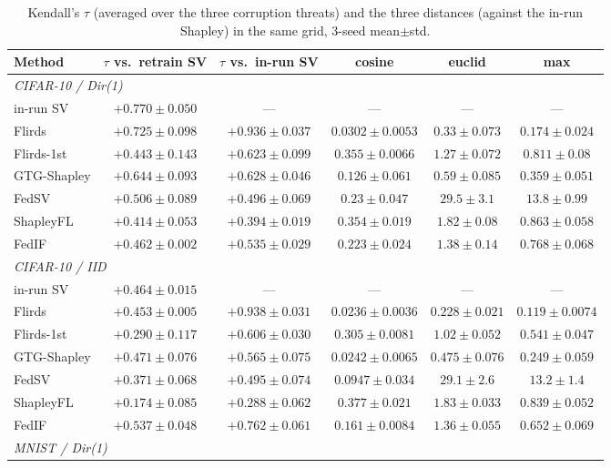 \documentclass[letterpaper]{article} %
\theoremstyle{plain}
\begin{document}
\begin{table}[t]
\centering
\small
\setlength{\tabcolsep}{5pt}
\caption{Kendall's $\tau$ (averaged over the three corruption threats) and
the three distances (against the in-run Shapley) in the same grid, 3-seed
mean$\pm$std.}
\label{tab:grid-kendall}
\begin{tabular}{lccccc}
\hline
Method & $\tau$ vs.\ retrain SV & $\tau$ vs.\ in-run SV & cosine & euclid & max \\
\hline
\multicolumn{6}{l}{\emph{CIFAR-10 / Dir(1)}} \\
in-run SV & $+0.770\pm0.050$ & --- & --- & --- & --- \\
Flirds & $+0.725\pm0.098$ & $+0.936\pm0.037$ & $0.0302\pm0.0053$ & $0.33\pm0.073$ & $0.174\pm0.024$ \\
Flirds-1st & $+0.443\pm0.143$ & $+0.623\pm0.099$ & $0.355\pm0.0066$ & $1.27\pm0.072$ & $0.811\pm0.08$ \\
GTG-Shapley & $+0.644\pm0.093$ & $+0.628\pm0.046$ & $0.126\pm0.061$ & $0.59\pm0.085$ & $0.359\pm0.051$ \\
FedSV & $+0.506\pm0.089$ & $+0.496\pm0.069$ & $0.23\pm0.047$ & $29.5\pm3.1$ & $13.8\pm0.99$ \\
ShapleyFL & $+0.414\pm0.053$ & $+0.394\pm0.019$ & $0.354\pm0.019$ & $1.82\pm0.08$ & $0.863\pm0.058$ \\
FedIF & $+0.462\pm0.002$ & $+0.535\pm0.029$ & $0.223\pm0.024$ & $1.38\pm0.14$ & $0.768\pm0.068$ \\
\hline
\multicolumn{6}{l}{\emph{CIFAR-10 / IID}} \\
in-run SV & $+0.464\pm0.015$ & --- & --- & --- & --- \\
Flirds & $+0.453\pm0.005$ & $+0.938\pm0.031$ & $0.0236\pm0.0036$ & $0.228\pm0.021$ & $0.119\pm0.0074$ \\
Flirds-1st & $+0.290\pm0.117$ & $+0.606\pm0.030$ & $0.305\pm0.0081$ & $1.02\pm0.052$ & $0.541\pm0.047$ \\
GTG-Shapley & $+0.471\pm0.076$ & $+0.565\pm0.075$ & $0.0242\pm0.0065$ & $0.475\pm0.076$ & $0.249\pm0.059$ \\
FedSV & $+0.371\pm0.068$ & $+0.495\pm0.074$ & $0.0947\pm0.034$ & $29.1\pm2.6$ & $13.2\pm1.4$ \\
ShapleyFL & $+0.174\pm0.085$ & $+0.288\pm0.062$ & $0.377\pm0.021$ & $1.83\pm0.033$ & $0.839\pm0.052$ \\
FedIF & $+0.537\pm0.048$ & $+0.762\pm0.061$ & $0.161\pm0.0084$ & $1.36\pm0.055$ & $0.652\pm0.069$ \\
\hline
\multicolumn{6}{l}{\emph{MNIST / Dir(1)}} \\

\end{tabular}
\end{table}
\end{document}
